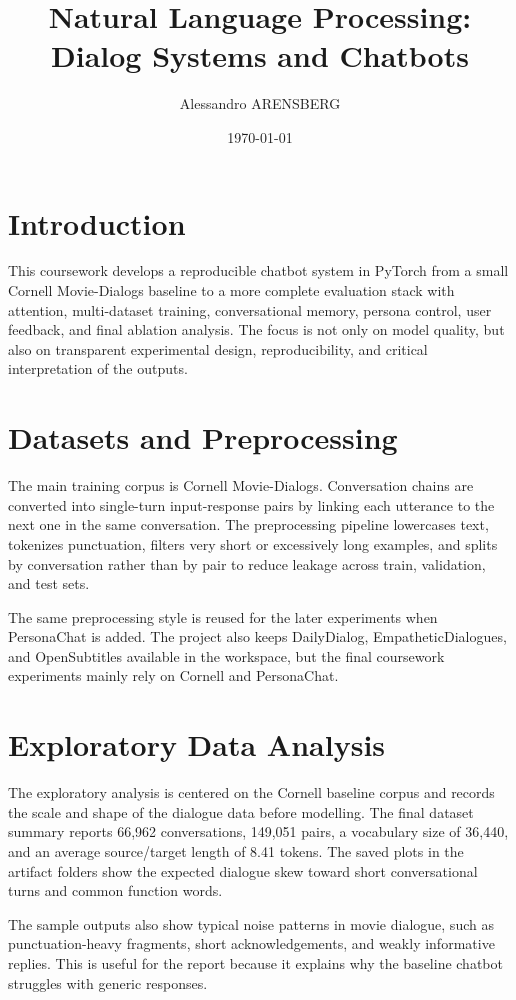 \documentclass[11pt,a4paper]{article}
\title{Natural Language Processing: Dialog Systems and Chatbots}
\author{Alessandro ARENSBERG}
\date{\today}
\begin{document}
\maketitle
	\tableofcontents
\newpage

\section{Introduction}
This coursework develops a reproducible chatbot system in PyTorch from a small Cornell Movie-Dialogs baseline to a more complete evaluation stack with attention, multi-dataset training, conversational memory, persona control, user feedback, and final ablation analysis. The focus is not only on model quality, but also on transparent experimental design, reproducibility, and critical interpretation of the outputs.

\section{Datasets and Preprocessing}
The main training corpus is Cornell Movie-Dialogs. Conversation chains are converted into single-turn input-response pairs by linking each utterance to the next one in the same conversation. The preprocessing pipeline lowercases text, tokenizes punctuation, filters very short or excessively long examples, and splits by conversation rather than by pair to reduce leakage across train, validation, and test sets.

The same preprocessing style is reused for the later experiments when PersonaChat is added. The project also keeps DailyDialog, EmpatheticDialogues, and OpenSubtitles available in the workspace, but the final coursework experiments mainly rely on Cornell and PersonaChat.

\section{Exploratory Data Analysis}
The exploratory analysis is centered on the Cornell baseline corpus and records the scale and shape of the dialogue data before modelling. The final dataset summary reports 66,962 conversations, 149,051 pairs, a vocabulary size of 36,440, and an average source/target length of 8.41 tokens. The saved plots in the artifact folders show the expected dialogue skew toward short conversational turns and common function words.

The sample outputs also show typical noise patterns in movie dialogue, such as punctuation-heavy fragments, short acknowledgements, and weakly informative replies. This is useful for the report because it explains why the baseline chatbot struggles with generic responses.
\end{document}
